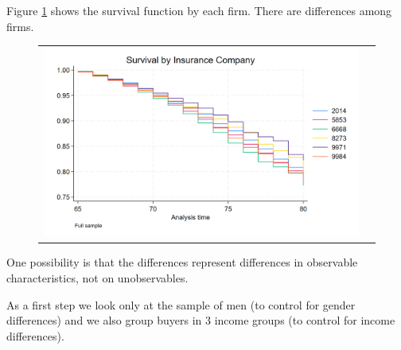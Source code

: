 \documentclass[12pt]{article}
\begin{document}
Figure \ref{fig:ie6_2} shows the survival function by each firm. There are differences among firms. 
\begin{figure}[H]
\caption{}
\label{fig:ie6_2}
\centering{}%
\begin{tabular}{cc}
\includegraphics[scale=0.27]{../figures/IE6/IE6_survival_year_all.png} 
\end{tabular}
\end{figure}

One possibility is that the differences represent differences in observable characteristics, not on unobservables. 

As a first step we look only at the sample of men (to control for gender differences) and we also group buyers in 3 income groups (to control for income differences). 
\end{document}
